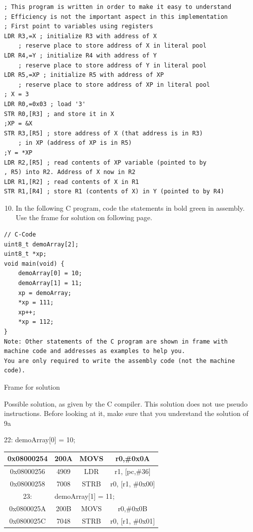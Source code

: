 \documentclass[10pt]{article}
\begin{document}
\begin{verbatim}
; This program is written in order to make it easy to understand
; Efficiency is not the important aspect in this implementation
; First point to variables using registers
LDR R3,=X ; initialize R3 with address of X
    ; reserve place to store address of X in literal pool
LDR R4,=Y ; initialize R4 with address of Y
    ; reserve place to store address of Y in literal pool
LDR R5,=XP ; initialize R5 with address of XP
    ; reserve place to store address of XP in literal pool
; X = 3
LDR R0,=0x03 ; load '3'
STR R0,[R3] ; and store it in X
;XP = &X
STR R3,[R5] ; store address of X (that address is in R3)
    ; in XP (address of XP is in R5)
;Y = *XP
LDR R2,[R5] ; read contents of XP variable (pointed to by
, R5) into R2. Address of X now in R2
LDR R1,[R2] ; read contents of X in R1
STR R1,[R4] ; store R1 (contents of X) in Y (pointed to by R4)
\end{verbatim}

\begin{enumerate}
  \setcounter{enumi}{9}
  \item In the following C program, code the statements in bold green in assembly. Use the frame for solution on following page.
\end{enumerate}

\begin{verbatim}
// C-Code
uint8_t demoArray[2];
uint8_t *xp;
void main(void) {
    demoArray[0] = 10;
    demoArray[1] = 11;
    xp = demoArray;
    *xp = 111;
    xp++;
    *xp = 112;
}
Note: Other statements of the C program are shown in frame with machine code and addresses as examples to help you.
You are only required to write the assembly code (not the machine code).
\end{verbatim}

Frame for solution

Possible solution, as given by the C compiler. This solution does not use pseudo instructions. Before looking at it, make sure that you understand the solution of 9a

22: demoArray[0] = 10;

\begin{center}
\begin{tabular}{|c|c|c|c|}
\hline
0x08000254 & 200A & MOVS & r0,\#0x0A \\
\hline
0x08000256 & 4909 & LDR & r1, [pc,\#36] \\
\hline
0x08000258 & 7008 & STRB & r0, [r1, \#0x00] \\
\hline
23: & \multicolumn{3}{|l|}{demoArray[1] = 11;} \\
\hline
0x0800025A & 200B & MOVS & r0,\#0x0B \\
\hline
0x0800025C & 7048 & STRB & r0, [r1, \#0x01] \\
\hline
\end{tabular}
\end{center}
\end{document}
